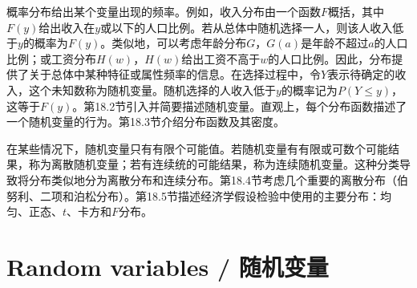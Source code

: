 \begin{translation}
概率分布给出某个变量出现的频率。例如，收入分布由一个函数$F$概括，其中$F(y)$给出收入在$y$或以下的人口比例。若从总体中随机选择一人，则该人收入低于$y$的概率为$F(y)$。类似地，可以考虑年龄分布$G$，$G(a)$是年龄不超过$a$的人口比例；或工资分布$H(w)$，$H(w)$给出工资不高于$w$的人口比例。因此，分布提供了关于总体中某种特征或属性频率的信息。在选择过程中，令$Y$表示待确定的收入，这个未知数称为随机变量。随机选择的人收入低于$y$的概率记为$P(Y \leq y)$，这等于$F(y)$。第18.2节引入并简要描述随机变量。直观上，每个分布函数描述了一个随机变量的行为。第18.3节介绍分布函数及其密度。

在某些情况下，随机变量只有有限个可能值。若随机变量有有限或可数个可能结果，称为离散随机变量；若有连续统的可能结果，称为连续随机变量。这种分类导致将分布类似地分为离散分布和连续分布。第18.4节考虑几个重要的离散分布（伯努利、二项和泊松分布）。第18.5节描述经济学假设检验中使用的主要分布：均匀、正态、$t$、卡方和$F$分布。
\end{translation}

\section{Random variables / 随机变量}

